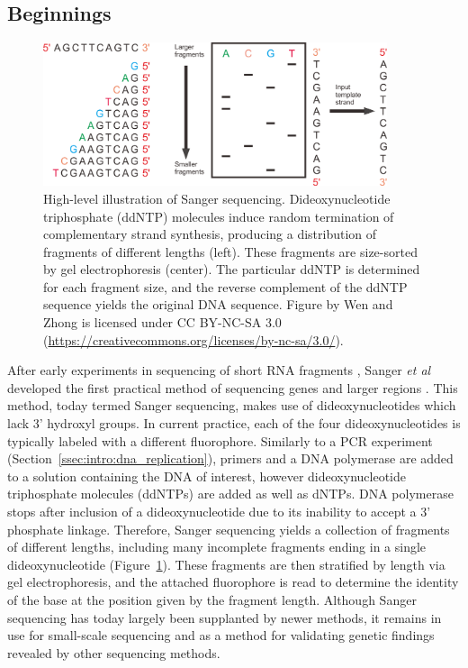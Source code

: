 \subsection{Beginnings}
\label{ssec:intro:seq_beginnings}
\begin{figure}[htb]
    \centering
    \includegraphics[width=0.9\textwidth,keepaspectratio]{images/intro/sanger_sequencing}
    \caption[High-level illustration of Sanger sequencing.]{High-level illustration of Sanger sequencing. Dideoxynucleotide triphosphate (ddNTP) molecules induce random termination of complementary strand synthesis, producing a distribution of fragments of different lengths (left). These fragments are size-sorted by gel electrophoresis (center). The particular ddNTP is determined for each fragment size, and the reverse complement of the ddNTP sequence yields the original DNA sequence. Figure by Wen and Zhong \cite{wen2019} is licensed under CC BY-NC-SA 3.0 (\url{https://creativecommons.org/licenses/by-nc-sa/3.0/}).}
    \label{fig:intro:sanger_schematic}
\end{figure}
After early experiments in sequencing of short RNA fragments \cite{minjou1972}, Sanger \textit{et al} developed the first practical method of sequencing genes and larger regions \cite{sanger1977,sanger1978}. This method, today termed Sanger sequencing, makes use of dideoxynucleotides which lack 3' hydroxyl groups. In current practice, each of the four dideoxynucleotides is typically labeled with a different fluorophore. Similarly to a PCR experiment (Section~\ref{ssec:intro:dna_replication}), primers and a DNA polymerase are added to a solution containing the DNA of interest, however dideoxynucleotide triphosphate molecules (ddNTPs) are added as well as dNTPs. DNA polymerase stops after inclusion of a dideoxynucleotide due to its inability to accept a 3' phosphate linkage. Therefore, Sanger sequencing yields a collection of fragments of different lengths, including many incomplete fragments ending in a single dideoxynucleotide (Figure~\ref{fig:intro:sanger_schematic}). These fragments are then stratified by length via gel electrophoresis, and the attached fluorophore is read to determine the identity of the base at the position given by the fragment length. Although Sanger sequencing has today largely been supplanted by newer methods, it remains in use for small-scale sequencing and as a method for validating genetic findings revealed by other sequencing methods.

